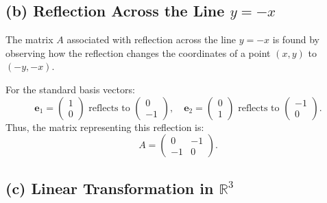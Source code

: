 \documentclass[11pt]{article}
\begin{document}
\newpage

\subsection{(b) Reflection Across the Line \( y = -x \)}

The matrix \( A \) associated with reflection across the line \( y = -x \) is found by observing how the reflection changes the coordinates of a point \( (x, y) \) to \( (-y, -x) \).

For the standard basis vectors:
\[
\mathbf{e}_1 = \begin{pmatrix} 1 \\ 0 \end{pmatrix} \text{ reflects to } \begin{pmatrix} 0 \\ -1 \end{pmatrix},
\quad \mathbf{e}_2 = \begin{pmatrix} 0 \\ 1 \end{pmatrix} \text{ reflects to } \begin{pmatrix} -1 \\ 0 \end{pmatrix}.
\]
Thus, the matrix representing this reflection is:
\[
A = \begin{pmatrix} 0 & -1 \\ -1 & 0 \end{pmatrix}.
\]

\newpage

\subsection{(c) Linear Transformation in \( \mathbb{R}^3 \)}
\end{document}
